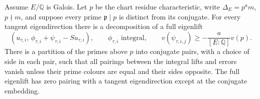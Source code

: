 \begin{srlemma}
\label{lem:ftb-ramified-eigenlifts}
Assume \(E/\mathbb Q\) is Galois.
Let \(p\) be the chart residue characteristic, write
\(\Delta_E=p^a m\), \(p\nmid m\), and suppose every prime
\(\mathfrak p\mid p\) is distinct from its conjugate.
For every tangent eigendirection there is a decomposition of a full
eigenlift
\[
 (u_{\tau,i},\,\phi_{\tau,i}+\psi_{\tau,i}-Su_{\tau,i}),
 \qquad\phi_{\tau,i}\text{ integral},\qquad
 v(\psi_{\tau,i,j})\ge-\frac{a}{[E:\mathbb Q]}v(p).
\]
There is a partition of the primes above \(p\) into conjugate pairs,
with a choice of side in each pair, such that all pairings between
the integral lifts and errors vanish unless their prime colours are
equal and their sides opposite.
The full eigenlift has zero pairing with a tangent eigendirection
except at the conjugate embedding.
\end{srlemma}
